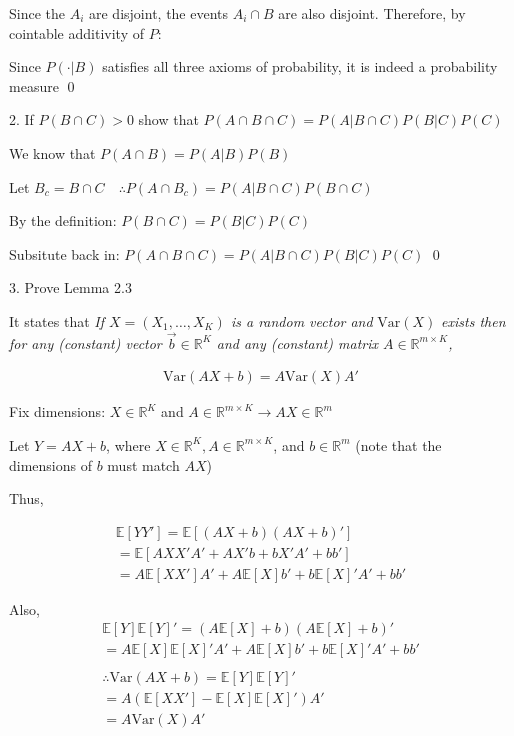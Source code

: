 \documentclass[10pt]{article}
\begin{document}
Since the $A_i$ are disjoint, the events $A_i \cap B$ are also disjoint. Therefore, by cointable additivity of $P$:

Since $P(\cdot | B)$ satisfies all three axioms of probability, it is indeed a probability measure \qed

\newpage

2. If $P(B \cap C) > 0$ show that $P(A \cap B \cap C) = P(A | B \cap C)P(B | C)P(C)$

We know that $P(A \cap B) = P(A|B)P(B)$

Let $B_c = B \cap C \quad\therefore P(A \cap B_c) = P(A | B\cap C)P(B\cap C)$

By the definition: $P(B\cap C) = P(B | C)P(C)$

Subsitute back in: $P(A \cap B \cap C) = P(A | B \cap C)P(B | C)P(C)$ \qed

\hfill 

3. Prove Lemma 2.3

It states that \textit{If $X = (X_1, …, X_K)$ is a random vector and} $\text{Var}(X)$ \textit{exists then for any (constant) vector $\vec{b} \in \mathbb{R}^K$ and any (constant) matrix $A \in \mathbb{R}^{m \times K}$,}

\begin{gather*}
    \text{Var}(AX + b) = A\text{Var}(X)A'
\end{gather*}

Fix dimensions: $X \in \mathbb{R}^K$ and $A \in \mathbb{R}^{m \times K} \to AX \in \mathbb{R}^m$

Let $Y = AX + b$, where $X \in \mathbb{R}^K, A \in \mathbb{R}^{m \times K}$, and $b \in \mathbb{R}^m$ (note that the dimensions of $b$ must match $AX$)

Thus, 

\begin{gather*}
    \mathbb{E}[YY'] = \mathbb{E}[(AX + b)(AX + b)']\\
    = \mathbb{E}[AXX'A' + AX'b + bX'A' + bb']\\
    = A\mathbb{E}[XX']A' + A\mathbb{E}[X]b' + b\mathbb{E}[X]'A' + bb'
\end{gather*}

Also, 
\begin{gather*}
    \mathbb{E}[Y]\mathbb{E}[Y]' = (A\mathbb{E}[X] + b)(A\mathbb{E}[X] + b)'\\
    = A\mathbb{E}[X]\mathbb{E}[X]'A' + A\mathbb{E}[X]b' + b\mathbb{E}[X]'A' + bb'\\
    \\
    \therefore \text{Var}(AX + b) = \mathbb{E}[Y]\mathbb{E}[Y]' \\
    = A(\mathbb{E}[XX'] - \mathbb{E}[X]\mathbb{E}[X]')A'\\
    = A\text{Var}(X)A'
\end{gather*}
\end{document}
